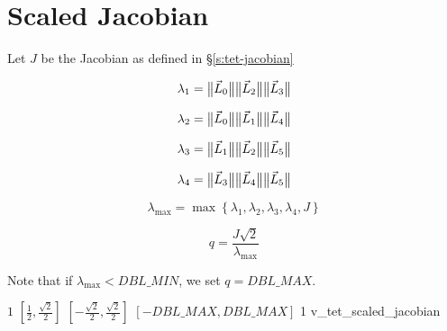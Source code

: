 \section{Scaled Jacobian}

Let $J$ be the Jacobian as defined in \S\ref{s:tet-jacobian}

\[
\lambda_1 = \big\lVert{\vec L_0 }\big\rVert
            \big\lVert{\vec L_2 }\big\rVert
            \big\lVert{\vec L_3 }\big\rVert  
\]

\[
\lambda_2 = \big\lVert{\vec L_0 }\big\rVert
            \big\lVert{\vec L_1 }\big\rVert
            \big\lVert{\vec L_4 }\big\rVert  
\]

\[
\lambda_3 = \big\lVert{\vec L_1 }\big\rVert
            \big\lVert{\vec L_2 }\big\rVert
            \big\lVert{\vec L_5 }\big\rVert  
\]

\[
\lambda_4 = \big\lVert{\vec L_3 }\big\rVert
            \big\lVert{\vec L_4 }\big\rVert
            \big\lVert{\vec L_5 }\big\rVert  
\]


\[
\lambda_{\max} = \max\left\{\lambda_1, \lambda_2, \lambda_3, \lambda_4, J\right\} 
\]

\begin{equation*}
q = \frac{J\sqrt{2}}{\lambda_{\max}}
\end{equation*}

Note that if $\lambda_{\max} < DBL\_MIN$, we set $q = DBL\_MAX$.

%
{$1$}%
{$[\frac{1}{2},\frac{\sqrt{2}}{2}]$}%
{$[-\frac{\sqrt{2}}{2},\frac{\sqrt{2}}{2}]$}%
{$[-DBL\_MAX,DBL\_MAX]$}%
{1}%
{\cite{knu:00}}%
{v\_tet\_scaled\_jacobian}%

